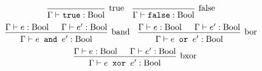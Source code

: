 \documentclass[english, 12pt]{article}
\DeclareMathOperator{\Bool}{Bool}
\begin{document}
\begin{align*}
     &
    \begin{prooftree}
        \infer0[true]{\Gamma \vdash \texttt{true} : \Bool}
    \end{prooftree}
     &
     &
    \begin{prooftree}
        \infer0[false]{\Gamma \vdash \texttt{false} : \Bool}
    \end{prooftree}
\end{align*}
\begin{align*}
     &
    \begin{prooftree}
        \hypo{\Gamma \vdash e : \Bool}
        \hypo{\Gamma \vdash e' : \Bool}
        \infer2[band]{\Gamma \vdash e \texttt{ and } e' : \Bool}
    \end{prooftree}
     &
     &
    \begin{prooftree}
        \hypo{\Gamma \vdash e : \Bool}
        \hypo{\Gamma \vdash e' : \Bool}
        \infer2[bor]{\Gamma \vdash e \texttt{ or } e' : \Bool}
    \end{prooftree}
\end{align*}
\[
    \begin{prooftree}
        \hypo{\Gamma \vdash e : \Bool}
        \hypo{\Gamma \vdash e' : \Bool}
        \infer2[bxor]{\Gamma \vdash e \texttt{ xor } e' : \Bool}
    \end{prooftree}
\]
\end{document}
